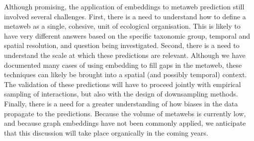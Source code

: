 \documentclass[
  letterpaper,
  DIV=11,
  numbers=noendperiod]{scrartcl}
\begin{document}
Although promising, the application of embeddings to metaweb prediction
still involved several challenges. First, there is a need to understand
how to define a metaweb as a single, cohesive, unit of ecological
organisation. This is likely to have very different answers based on the
specific taxonomic group, temporal and spatial resolution, and question
being investigated. Second, there is a need to understand the scale at
which these predictions are relevant. Although we have documented many
cases of using embedding to fill gaps in the metaweb, these techniques
can likely be brought into a spatial (and possibly temporal) context.
The validation of these predictions will have to proceed jointly with
empirical sampling of interactions, but also with the design of
downsampling methods. Finally, there is a need for a greater
understanding of how biases in the data propagate to the predictions.
Because the volume of metawebs is currently low, and because graph
embeddings have not been commonly applied, we anticipate that this
discussion will take place organically in the coming years.
\end{document}
